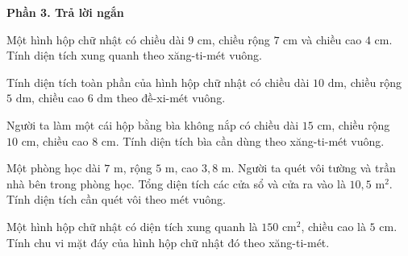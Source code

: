\textbf{Phần 3. Trả lời ngắn}

\begin{ex} %
Một hình hộp chữ nhật có chiều dài $9\text{ cm}$, chiều rộng $7\text{ cm}$ và chiều cao $4\text{ cm}$. Tính diện tích xung quanh theo xăng-ti-mét vuông.
\end{ex}

\begin{ex} %
Tính diện tích toàn phần của hình hộp chữ nhật có chiều dài $10\text{ dm}$, chiều rộng $5\text{ dm}$, chiều cao $6\text{ dm}$ theo đề-xi-mét vuông.
\end{ex}

\begin{ex} %
Người ta làm một cái hộp bằng bìa không nắp có chiều dài $15\text{ cm}$, chiều rộng $10\text{ cm}$, chiều cao $8\text{ cm}$. Tính diện tích bìa cần dùng theo xăng-ti-mét vuông.
\end{ex}

\begin{ex} %
Một phòng học dài $7\text{ m}$, rộng $5\text{ m}$, cao $3{,}8\text{ m}$. Người ta quét vôi tường và trần nhà bên trong phòng học. Tổng diện tích các cửa sổ và cửa ra vào là $10{,}5\text{ m}^2$. Tính diện tích cần quét vôi theo mét vuông.
\end{ex}

\begin{ex} %
Một hình hộp chữ nhật có diện tích xung quanh là $150\text{ cm}^2$, chiều cao là $5\text{ cm}$. Tính chu vi mặt đáy của hình hộp chữ nhật đó theo xăng-ti-mét.
\end{ex}

